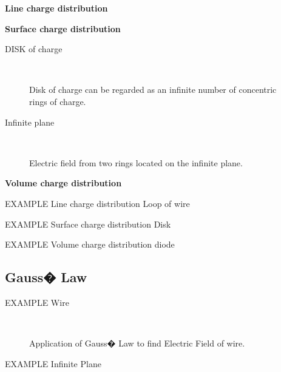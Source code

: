 {\bf Line charge distribution}


{\bf Surface charge distribution}


DISK of charge

\begin{figure}[htbp]
\begin{center}
\strut{} \\
\end{center}
\caption{Disk of charge can be regarded as an infinite number of concentric rings of charge.}
\label{wind}
\end{figure}

Infinite plane

\begin{figure}[htbp]
\begin{center}
\strut{} \\
\end{center}
\caption{Electric field from two rings located on the infinite plane.}
\label{wind}
\end{figure}




{\bf Volume charge distribution}





{\large EXAMPLE} Line charge distribution Loop of wire

{\large EXAMPLE} Surface charge distribution Disk

{\large EXAMPLE} Volume charge distribution diode


\subsection{Gauss� Law}




{\large EXAMPLE} Wire



\begin{figure}[htbp]
\begin{center}
\strut{} \\
\end{center}
\caption{Application of Gauss� Law to find Electric Field of wire.}
\label{wind}
\end{figure}




{\large EXAMPLE} Infinite Plane



